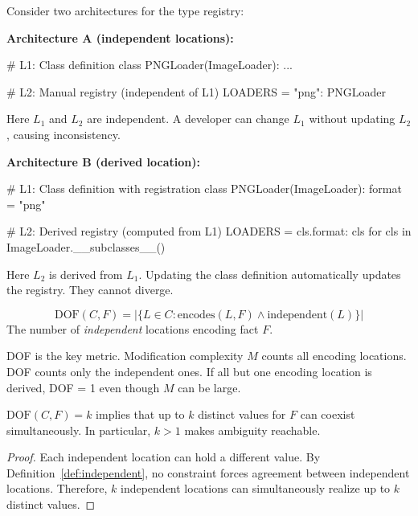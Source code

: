 \begin{example}\label{ex:independence}
Consider two architectures for the type registry:

\textbf{Architecture A (independent locations):}
\begin{code}
# L1: Class definition
class PNGLoader(ImageLoader): ...

# L2: Manual registry (independent of L1)
LOADERS = {"png": PNGLoader}
\end{code}

Here $L_1$ and $L_2$ are independent. A developer can change $L_1$ without updating $L_2$, causing inconsistency.

\textbf{Architecture B (derived location):}
\begin{code}
# L1: Class definition with registration
class PNGLoader(ImageLoader):
    format = "png"

# L2: Derived registry (computed from L1)
LOADERS = {cls.format: cls for cls in ImageLoader.__subclasses__()}
\end{code}

Here $L_2$ is derived from $L_1$. Updating the class definition automatically updates the registry. They cannot diverge.
\end{example}

\begin{definition}\label{def:dof}
\[
\text{DOF}(C, F) = |\{L \in C : \text{encodes}(L, F) \land \text{independent}(L)\}|
\]
The number of \emph{independent} locations encoding fact $F$.
\end{definition}

DOF is the key metric. Modification complexity $M$ counts all encoding locations. DOF counts only the independent ones. If all but one encoding location is derived, DOF = 1 even though $M$ can be large.

\begin{theorem}[DOF = Incoherence Potential]\label{thm:dof-inconsistency}
$\text{DOF}(C, F) = k$ implies that up to $k$ distinct values for $F$ can coexist simultaneously. In particular, $k>1$ makes ambiguity reachable.
\end{theorem}

\begin{proof}
Each independent location can hold a different value. By Definition~\ref{def:independent}, no constraint forces agreement between independent locations. Therefore, $k$ independent locations can simultaneously realize up to $k$ distinct values.
\end{proof}

